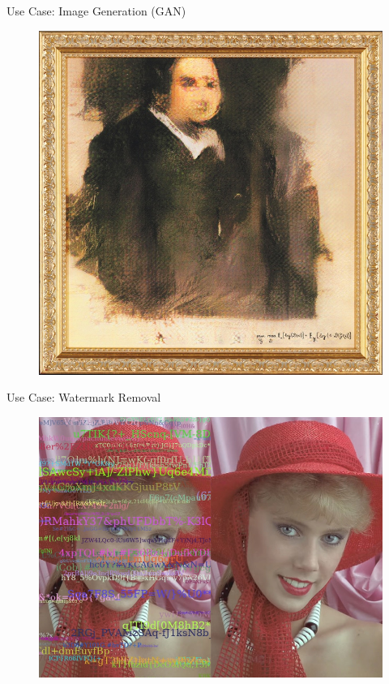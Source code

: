 \begin{frame}{Use Case: Image Generation (GAN)}{}
	\begin{figure}
		\centering
		\includegraphics[scale=0.25]{10_deep_learning/02_img/image_generation}
	\end{figure}
\end{frame}


\begin{frame}{Use Case: Watermark Removal}{}
	\begin{figure}
		\centering
		\includegraphics[scale=0.25]{10_deep_learning/02_img/watermark_removal}
	\end{figure}
\end{frame}


